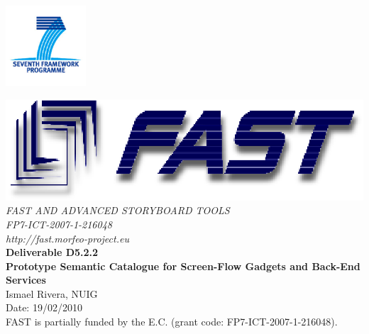 \documentclass{fast_latex}
\newcommand\deliverableNumber{D5.2.2}
\newcommand\deliverableTitle{Prototype Semantic Catalogue for Screen-Flow Gadgets and Back-End Services}
\newcommand\authorOne{Ismael Rivera, NUIG}
\begin{document}

\def\note#1{\marginpar{\footnotesize#1}} %


\newenvironment{definition}{}{}

\thispagestyle{empty}


\begin{flushright}
	\includegraphics[width=3cm]{images/FP7_logo}
\end{flushright}

\vspace{1cm}

	\begin{center}
		\includegraphics{images/FAST_logo}\\
		\vspace{1cm}
		{\LARGE{\sffamily \emph{FAST AND ADVANCED STORYBOARD TOOLS}}}\\
		\vspace{0.5cm}
		{\LARGE \sffamily \emph{FP7-ICT-2007-1-216048}}\\
		\vspace{0.5cm}
		{\LARGE \sffamily \emph{http://fast.morfeo-project.eu}}\\
		\vspace{4cm}
		{\LARGE \sffamily \textbf{Deliverable \deliverableNumber}}\\
		\vspace{0.5cm}
		{\LARGE \sffamily \textbf{\deliverableTitle}}\\
		\vspace{2cm}
		{\large \sffamily \authorOne}\\
		\vspace{0.5cm}
		\vfill
		{\large \sffamily Date: 19/02/2010}\\
		\vspace{1cm}
		{\sffamily FAST is partially funded by the E.C. (grant code: FP7-ICT-2007-1-216048).}
		
	\end{center}
\end{document}
